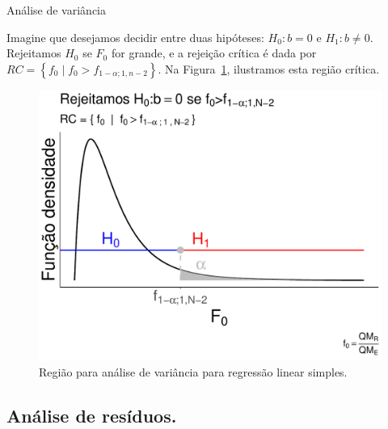 \documentclass[8pt]{beamer}
\begin{document}
\begin{frame}{Análise de variância}

Imagine que desejamos decidir entre duas hipóteses: $H_0: b= 0$ e $H_1: b \neq 0$. Rejeitamos $H_0$ se $F_0$ for grande, e a rejeição crítica é dada por $RC = \left\{ f_0 \mid f_0 > f_{1-\alpha; 1, n-2} \right\}$. Na Figura~\ref{fig:anova-reg}, ilustramos esta região crítica.

\begin{figure}
	\centering
	\includegraphics[width=0.65\linewidth]{figure/anova.pdf}
	\caption{Região para análise de variância para regressão linear simples.}
	\label{fig:anova-reg}
\end{figure}

\end{frame}

\subsection{Análise de resíduos.}
\end{document}
